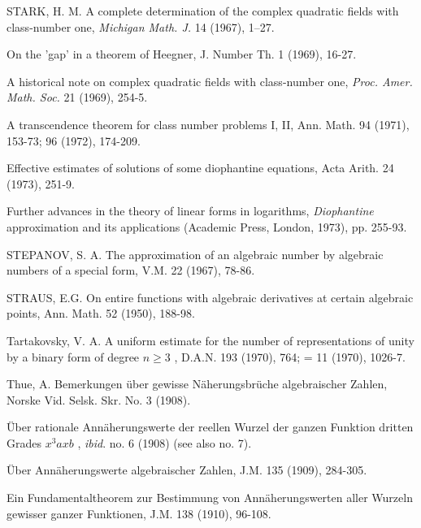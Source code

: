 \begin{hanglist}
    \item STARK, H. M. A complete determination of the complex quadratic fields with class-number one, \textit{Michigan Math. J.} 14 (1967), 1–27.
    \item \hspace{1.5em} On the 'gap' in a theorem of Heegner, J. Number Th. 1 (1969), 16-27.
    \item \hspace{1.5em} A historical note on complex quadratic fields with class-number one, \textit{Proc. Amer. Math. Soc.} 21 (1969), 254-5.
    \item \hspace{1.5em} A transcendence theorem for class number problems I, II, Ann. Math. 94 (1971), 153-73; 96 (1972), 174-209.
    \item \hspace{1.5em} Effective estimates of solutions of some diophantine equations, Acta Arith. 24 (1973), 251-9.
    \item \hspace{1.5em} Further advances in the theory of linear forms in logarithms, \textit{Diophantine} approximation and its applications (Academic Press, London, 1973), pp. 255-93.
    \item STEPANOV, S. A. The approximation of an algebraic number by algebraic numbers of a special form, V.M. 22 (1967), 78-86.
    \item STRAUS, E.G. On entire functions with algebraic derivatives at certain algebraic points, Ann. Math. 52 (1950), 188-98.
    \item Tartakovsky, V. A. A uniform estimate for the number of representations of unity by a binary form of degree  $n \ge 3$ , D.A.N. 193 (1970), 764; = 11 (1970), 1026-7.
    \item Thue, A. Bemerkungen über gewisse Näherungsbrüche algebraischer Zahlen, Norske Vid. Selsk. Skr. No. 3 (1908).
    \item \hspace{1.5em} Über rationale Annäherungswerte der reellen Wurzel der ganzen Funktion dritten Grades  $x^3 ax b$ , \textit{ibid}. no. 6 (1908) (see also no. 7).
    \item \hspace{1.5em} Über Annäherungswerte algebraischer Zahlen, J.M. 135 (1909), 284-305.
    \item \hspace{1.5em} Ein Fundamentaltheorem zur Bestimmung von Annäherungswerten aller Wurzeln gewisser ganzer Funktionen, J.M. 138 (1910), 96-108.

\end{hanglist}
